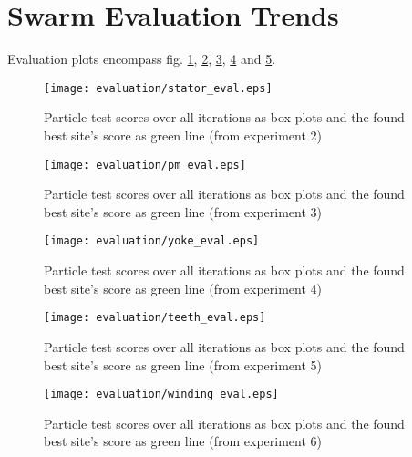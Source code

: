 \section{Swarm Evaluation Trends}
\label{app:evaluation}
Evaluation plots encompass fig. \ref{fig:stator_eval}, \ref{fig:pm_eval}, \ref{fig:yoke_eval}, \ref{fig:teeth_eval} and \ref{fig:winding_eval}.
\begin{figure}[!hbt]
	\centering
	\texttt{[image: evaluation/stator\_eval.eps]}
	\caption{Particle test scores over all iterations as box plots and the found best site's score as green line (from experiment 2)}
	\label{fig:stator_eval}
\end{figure}
\begin{figure}[!hbt]
	\centering
	\texttt{[image: evaluation/pm\_eval.eps]}
	\caption{Particle test scores over all iterations as box plots and the found best site's score as green line (from experiment 3)}
	\label{fig:pm_eval}
\end{figure}
\begin{figure}[!hbt]
	\centering
	\texttt{[image: evaluation/yoke\_eval.eps]}
	\caption{Particle test scores over all iterations as box plots and the found best site's score as green line (from experiment 4)}
	\label{fig:yoke_eval}
\end{figure}
\begin{figure}[!hbt]
	\centering
	\texttt{[image: evaluation/teeth\_eval.eps]}
	\caption{Particle test scores over all iterations as box plots and the found best site's score as green line (from experiment 5)}
	\label{fig:teeth_eval}
\end{figure}
\begin{figure}[!hbt]
	\centering
	\texttt{[image: evaluation/winding\_eval.eps]}
	\caption{Particle test scores over all iterations as box plots and the found best site's score as green line (from experiment 6)}
	\label{fig:winding_eval}
\end{figure}\clearpage

